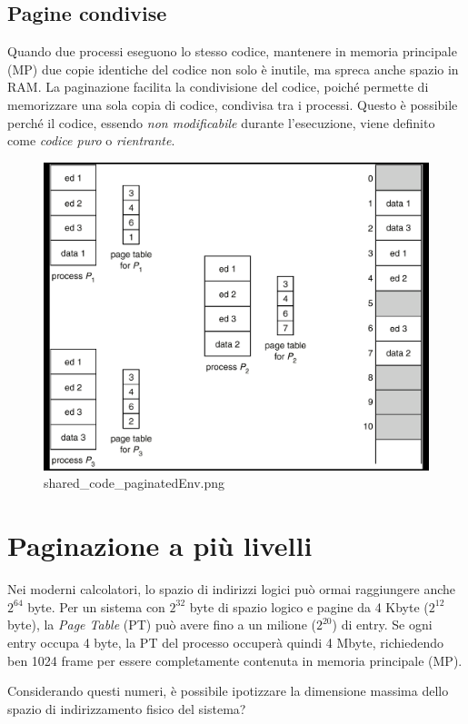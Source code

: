 \subsection{Pagine condivise}
Quando due processi eseguono lo stesso codice, mantenere in memoria principale (MP) due copie identiche del codice non solo è inutile, ma spreca anche spazio in RAM. La paginazione facilita la condivisione del codice, poiché permette di memorizzare una sola copia di codice, condivisa tra i processi. Questo è possibile perché il codice, essendo \emph{non modificabile} durante l'esecuzione, viene definito come \emph{codice puro} o \emph{rientrante}.


\begin{figure}[h] \centering \includegraphics[width=0.45\linewidth]{images/shared_code_paginatedEnv.png} \caption{shared_code_paginatedEnv.png} \label{fig:9.9a} \end{figure}

\section{Paginazione a più livelli}

Nei moderni calcolatori, lo spazio di indirizzi logici può ormai raggiungere anche \(2^{64}\) byte. Per un sistema con \(2^{32}\) byte di spazio logico e pagine da 4 Kbyte (\(2^{12}\) byte), la \emph{Page Table} (PT) può avere fino a un milione (\(2^{20}\)) di entry. Se ogni entry occupa 4 byte, la PT del processo occuperà quindi 4 Mbyte, richiedendo ben 1024 frame per essere completamente contenuta in memoria principale (MP).

\qs{} {
Considerando questi numeri, è possibile ipotizzare la dimensione massima dello spazio di indirizzamento fisico del sistema?
}


